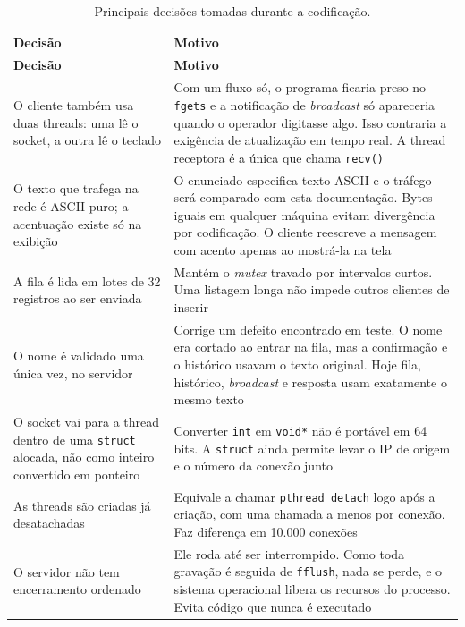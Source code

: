 \documentclass[12pt,a4paper]{article}
\begin{document}
{\footnotesize
\begin{longtable}{L{4.6cm} L{8.6cm}}
\caption{Principais decisões tomadas durante a codificação.}\\
\toprule
\textbf{Decisão} & \textbf{Motivo} \\
\midrule
\endfirsthead
\toprule
\textbf{Decisão} & \textbf{Motivo} \\
\midrule
\endhead
O cliente também usa duas threads: uma lê o socket, a outra lê o teclado &
Com um fluxo só, o programa ficaria preso no \texttt{fgets} e a notificação de
\textit{broadcast} só apareceria quando o operador digitasse algo. Isso
contraria a exigência de atualização em tempo real. A thread receptora é a única
que chama \texttt{recv()} \\
\addlinespace
O texto que trafega na rede é ASCII puro; a acentuação existe só na exibição &
O enunciado especifica texto ASCII e o tráfego será comparado com esta
documentação. Bytes iguais em qualquer máquina evitam divergência por
codificação. O cliente reescreve a mensagem com acento apenas ao mostrá-la na
tela \\
\addlinespace
A fila é lida em lotes de 32 registros ao ser enviada &
Mantém o \textit{mutex} travado por intervalos curtos. Uma listagem longa não
impede outros clientes de inserir \\
\addlinespace
O nome é validado uma única vez, no servidor &
Corrige um defeito encontrado em teste. O nome era cortado ao entrar na fila,
mas a confirmação e o histórico usavam o texto original. Hoje fila, histórico,
\textit{broadcast} e resposta usam exatamente o mesmo texto \\
\addlinespace
O socket vai para a thread dentro de uma \texttt{struct} alocada, não como
inteiro convertido em ponteiro &
Converter \texttt{int} em \texttt{void*} não é portável em 64 bits. A
\texttt{struct} ainda permite levar o IP de origem e o número da conexão junto \\
\addlinespace
As threads são criadas já desatachadas &
Equivale a chamar \texttt{pthread\_detach} logo após a criação, com uma chamada a
menos por conexão. Faz diferença em 10.000 conexões \\
\addlinespace
O servidor não tem encerramento ordenado &
Ele roda até ser interrompido. Como toda gravação é seguida de \texttt{fflush},
nada se perde, e o sistema operacional libera os recursos do processo. Evita
código que nunca é executado \\
\bottomrule
\end{longtable}}
\end{document}
